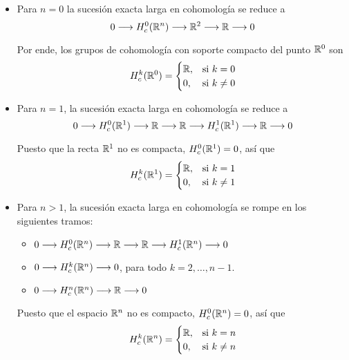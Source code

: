 \begin{solution}
\begin{itemize}
    \item Para $n = 0$ la sucesión exacta larga en cohomología se reduce a
    $$0 \longrightarrow H_c^0(\mathbb R^n) \longrightarrow \mathbb R^2 \longrightarrow \mathbb R \longrightarrow 0$$
    
    Por ende, los grupos de cohomología con soporte compacto del punto $\mathbb R^0$ son
    $$
    H_c^k(\mathbb R^0) =
        \begin{cases}
            \mathbb R, & \text{si } k = 0 \\
            0, & \text{si } k \ne 0
        \end{cases}
    $$
    
    \item Para $n = 1$, la sucesión exacta larga en cohomología se reduce a
    $$
    0
        \longrightarrow H_c^0(\mathbb R^1) \longrightarrow \mathbb R \longrightarrow \mathbb R
        \longrightarrow H_c^1(\mathbb R^1) \longrightarrow \mathbb R \longrightarrow 0
    $$
    
    Puesto que la recta $\mathbb R^1$ no es compacta, $H_c^0(\mathbb R^1) = 0$, así que
    $$
    H_c^k(\mathbb R^1) =
        \begin{cases}
            \mathbb R, & \text{si } k = 1 \\
            0, & \text{si } k \ne 1
        \end{cases}
    $$
    
    \item Para $n > 1$, la sucesión exacta larga en cohomología se rompe en los siguientes tramos:
    \begin{itemize}
        \item $0
        \longrightarrow H_c^0(\mathbb R^n)
        \longrightarrow \mathbb R
        \longrightarrow \mathbb R
        \longrightarrow H_c^1(\mathbb R^n)
        \longrightarrow 0$
        
        \item $0 \longrightarrow H_c^k(\mathbb R^n) \longrightarrow 0$,
        \hfill para todo $k = 2, \dots, n-1. \qquad \qquad$
        
        \item $0 \longrightarrow H_c^n(\mathbb R^n) \longrightarrow \mathbb R \longrightarrow 0$
    \end{itemize}
    
    Puesto que el espacio $\mathbb R^n$ no es compacto, $H_c^0(\mathbb R^n) = 0$, así que
    $$
    H_c^k(\mathbb R^n) =
        \begin{cases}
            \mathbb R, & \text{si } k = n \\
            0, & \text{si } k \ne n
        \end{cases}
    $$
\end{itemize}
\end{solution}
